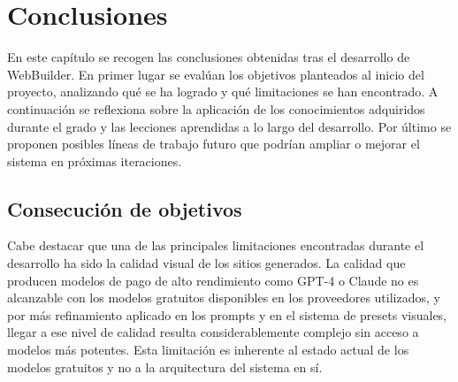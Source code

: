 
\cleardoublepage
\chapter{Conclusiones}
\label{chap:conclusiones}

En este capítulo se recogen las conclusiones obtenidas tras el desarrollo de WebBuilder. En primer lugar se evalúan los objetivos planteados al inicio del proyecto, analizando qué se ha logrado y qué limitaciones se han encontrado. A continuación se reflexiona sobre la aplicación de los conocimientos adquiridos durante el grado y las lecciones aprendidas a lo largo del desarrollo. Por último se proponen posibles líneas de trabajo futuro que podrían ampliar o mejorar el sistema en próximas iteraciones.

\section{Consecución de objetivos}
\label{sec:consecucion-objetivos}

%

Cabe destacar que una de las principales limitaciones encontradas durante el desarrollo ha sido la calidad visual de los sitios generados. La calidad que producen modelos de pago de alto rendimiento como GPT-4 o Claude no es alcanzable con los modelos gratuitos disponibles en los proveedores utilizados, y por más refinamiento aplicado en los prompts y en el sistema de presets visuales, llegar a ese nivel de calidad resulta considerablemente complejo sin acceso a modelos más potentes. Esta limitación es inherente al estado actual de los modelos gratuitos y no a la arquitectura del sistema en sí.

